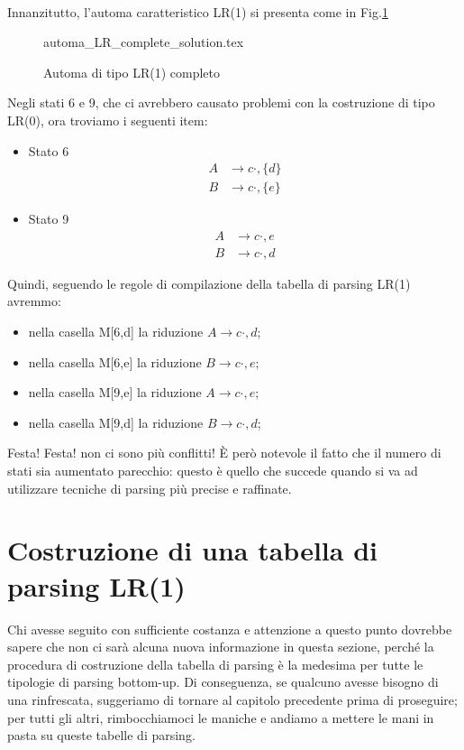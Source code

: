 \documentclass[class=book, crop=false, oneside, 12pt]{standalone}
\begin{document}
\paragraph{}
Innanzitutto, l'automa caratteristico LR(1) si presenta come in Fig.\ref{fig:lr1_automata-complete}
\begin{figure}[H]
    \centering
    {automa_LR_complete_solution.tex}
    \caption{Automa di tipo LR(1) completo}
    \label{fig:lr1_automata-complete}
\end{figure}
Negli stati 6 e 9, che ci avrebbero causato problemi con la costruzione di tipo LR(0), ora troviamo i seguenti item:
\begin{itemize}
    \item Stato 6
    \begin{align*}
        A &\to c \cdot , \{d\} \\
        B &\to c \cdot , \{e\}    
    \end{align*}
    \item Stato 9
    \begin{align*}
        A &\to c \cdot , {e} \\
        B &\to c \cdot , {d}    
    \end{align*}
\end{itemize}
 Quindi, seguendo le regole di compilazione della tabella di parsing LR(1) avremmo:
 \begin{itemize}
     \item nella casella M[6,d] la riduzione \(A \to c \cdot , {d}\);
     \item nella casella M[6,e] la riduzione \(B \to c \cdot , {e}\);
     \item nella casella M[9,e] la riduzione \(A \to c \cdot , {e}\);
     \item nella casella M[9,d] la riduzione \(B \to c \cdot , {d}\);
 \end{itemize}
Festa! Festa! non ci sono più conflitti!
È però notevole il fatto che il numero di stati sia aumentato parecchio: questo è quello che succede quando si va ad utilizzare tecniche di parsing più precise e raffinate.

\section{Costruzione di una tabella di parsing LR(1)}
Chi avesse seguito con sufficiente costanza e attenzione a questo punto dovrebbe sapere che non ci sarà alcuna nuova informazione in questa sezione, perché la procedura di costruzione della tabella di parsing è la medesima per tutte le tipologie di parsing bottom-up. Di conseguenza, se qualcuno avesse bisogno di una rinfrescata, suggeriamo di tornare al capitolo precedente prima di proseguire; per tutti gli altri, rimbocchiamoci le maniche e andiamo a mettere le mani in pasta su queste tabelle di parsing.  
\end{document}
